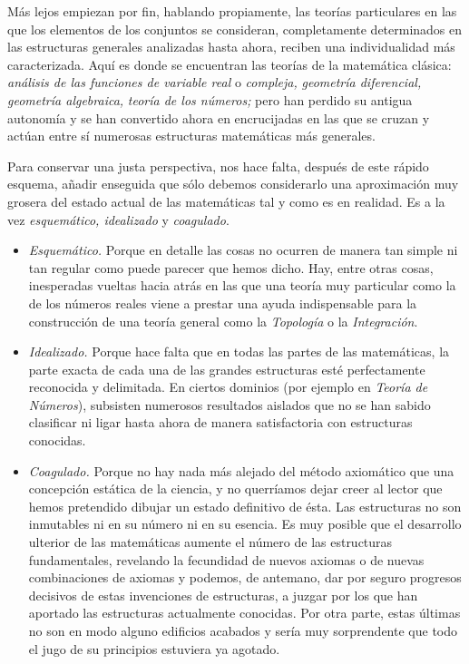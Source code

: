 \documentclass[a4paper, 12pt, draft]{article}
\begin{document}
Más lejos empiezan por fin, hablando propiamente, las teorías particulares en las que los elementos de los conjuntos se consideran, completamente determinados en las estructuras generales analizadas hasta ahora, reciben una individualidad más caracterizada. Aquí es donde se encuentran las teorías de la matemática clásica: \textit{análisis de las funciones de variable real} o \textit{compleja,} \textit{geometría diferencial,} \textit{geometría algebraica,} \textit{teoría de los números;} pero han perdido su antigua autonomía y se han convertido ahora en encrucijadas en las que se cruzan y actúan entre sí numerosas estructuras matemáticas más generales.

Para conservar una justa perspectiva, nos hace falta, después de este rápido esquema, añadir enseguida que sólo debemos considerarlo una aproximación muy grosera del estado actual de las matemáticas tal y como es en realidad. Es a la vez \textit{esquemático, idealizado} y \textit{coagulado}. 

\begin{itemize}
\vspace{- 1em}

\item \textit{Esquemático.} Porque en detalle las cosas no ocurren de manera tan simple ni tan regular como puede parecer que hemos dicho. Hay, entre otras cosas, inesperadas vueltas hacia atrás en las que una teoría muy particular como la de los números reales viene a prestar una ayuda indispensable para la construcción de una teoría general como la \textit{Topología} o la \textit{Integración}.

\item \textit{Idealizado.} Porque hace falta que en todas las partes de las matemá\-ticas, la parte exacta de cada una de las grandes estructuras esté perfectamente reconocida y delimitada. En ciertos dominios (por ejemplo en \textit{Teoría de Números}), subsisten numerosos resultados aislados que no se han sabido clasificar ni ligar hasta ahora de manera satisfactoria con estructuras conocidas.

\item \textit{Coagulado.} Porque no hay nada más alejado del método axiomático que una concepción estática de la ciencia, y no querríamos dejar creer al lector que hemos pretendido dibujar un estado definitivo de ésta. Las estructuras no son inmutables ni en su número ni en su esencia. Es muy posible que el desarrollo ulterior de las matemáticas aumente el número de las estructuras fundamentales, revelando la fecundidad de nuevos axiomas o de nuevas combinaciones de axiomas y podemos, de antemano, dar por seguro progresos decisivos de estas invenciones de estructuras, a juzgar por los que han aportado las estructuras actualmente conocidas. Por otra parte, estas últimas no son en modo alguno edificios acabados y sería muy sorprendente que todo el jugo de su principios estuviera ya agotado. 

\end{itemize}
\end{document}
